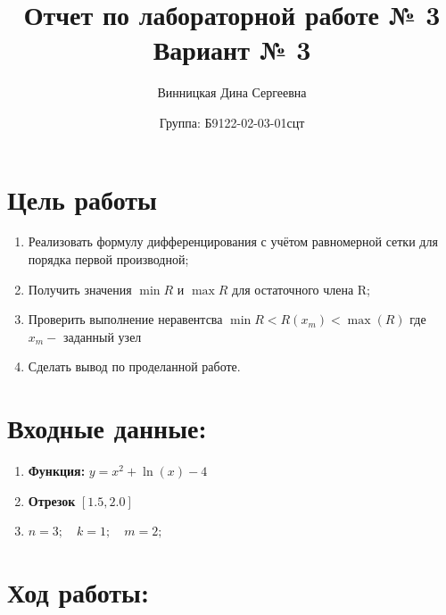 \documentclass{article}
\title{Отчет по лабораторной работе № 3\\ Вариант № 3}
\author{Винницкая Дина Сергеевна}
\date{Группа: Б9122-02-03-01сцт}
\begin{document}
\maketitle
\section*{Цель работы}
\begin{enumerate}
    \item Реализовать формулу дифференцирования с учётом равномерной сетки для порядка первой производной;
    \item Получить значения $\min{R}$ и $\max{R}$ для остаточного члена R;
    \item Проверить выполнение неравентсва $\min{R} < R(x_m) < \max(R)$ где $x_m - $ заданный узел
    \item Сделать вывод по проделанной работе.
\end{enumerate}

\section*{Входные данные:}
\begin{enumerate}

    \item \textbf{Функция:} $y=x^2 + \ln(x) - 4$
    \item \textbf{Отрезок} $[1.5,2.0]$
    \item $n = 3; \quad k = 1; \quad m = 2;$
    
\end{enumerate}

\section*{Ход работы:}
\end{document}
